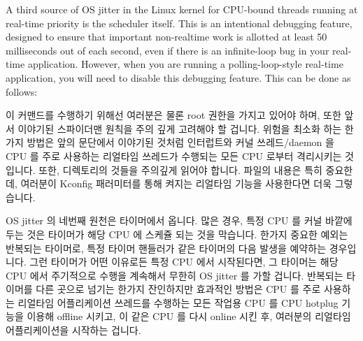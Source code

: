 A third source of OS jitter in the Linux kernel for CPU-bound threads
running at real-time priority is the scheduler itself.
This is an intentional debugging feature, designed to ensure that
important non-realtime work is allotted at least 50 milliseconds
out of each second, even if there is an infinite-loop bug in
your real-time application.
However, when you are running a polling-loop-style real-time application,
you will need to disable this debugging feature.
This can be done as follows:

\fi


이 커맨드를 수행하기 위해선 여러분은 물론 root 권한을 가지고 있어야 하며, 또한
앞서 이야기된 스파이더맨 원칙을 주의 깊게 고려해야 할 겁니다.
위험을 최소화 하는 한가지 방법은 앞의 문단에서 이야기된 것처럼 인터럽트와 커널
쓰레드/daemon 을 CPU 를 주로 사용하는 리얼타임 쓰레드가 수행되는 모든 CPU
로부터 격리시키는 것입니다.
또한,  디렉토리의 것들을 주의깊게 읽어야 합니다.
 파일의 내용은 특히 중요한데, 여러분이
 Kconfig 패러미터를 통해 켜지는  리얼타임
기능을 사용한다면 더욱 그렇습니다.

OS jitter 의 네번째 원천은 타이머에서 옵니다.
많은 경우, 특정 CPU 를 커널 바깥에 두는 것은 타이머가 해당 CPU 에 스케쥴 되는
것을 막습니다.
한가지 중요한 예외는 반복되는 타이머로, 특정 타이머 핸들러가 같은 타이머의 다음
발생을 예약하는 경우입니다.
그런 타이머가 어떤 이유로든 특정 CPU 에서 시작된다면, 그 타이머는 해당 CPU 에서
주기적으로 수행을 계속해서 무한히 OS jitter 를 가할 겁니다.
반복되는 타이머를 다른 곳으로 넘기는
한가지 잔인하지만 효과적인 방법은 CPU 를 주로 사용하는 리얼타임 어플리케이션
쓰레드를 수행하는 모든 작업용 CPU 를 CPU hotplug 기능을 이용해 offline 시키고,
이 같은 CPU 를 다시 online 시킨 후, 여러분의 리얼타임 어플리케이션을 시작하는
겁니다.

